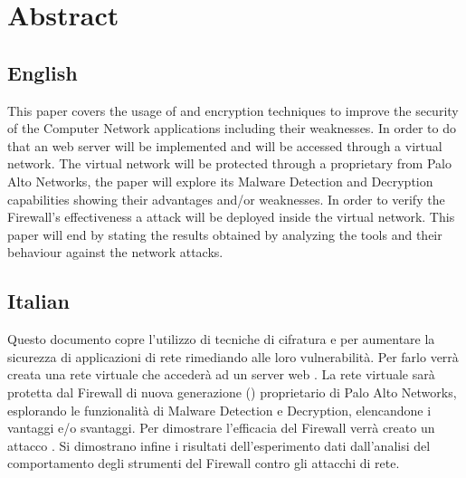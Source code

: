 \tableofcontents

\newpage

\chapter*{Abstract}


\section*{English}

This paper covers the usage of  and  encryption techniques to improve the security of the Computer Network applications including their weaknesses. In order to do that an  web server will be implemented and will be accessed through a virtual network.
The virtual network will be protected through a proprietary  from Palo Alto Networks, the paper will explore its Malware Detection and  Decryption capabilities showing their advantages and/or weaknesses.
In order to verify the Firewall's effectiveness a  attack will be deployed inside the virtual network.
This paper will end by stating the results obtained by analyzing the  tools and their behaviour against the network attacks.

\section*{Italian}

Questo documento copre l'utilizzo di tecniche di cifratura  e  per aumentare la sicurezza di applicazioni di rete rimediando alle loro vulnerabilit\`a.
Per farlo verr\`a creata una rete virtuale che acceder\`a ad un server web .
La rete virtuale sar\`a protetta dal Firewall di nuova generazione () proprietario di Palo Alto Networks, esplorando le funzionalit\`a di Malware Detection e  Decryption, elencandone i vantaggi e/o svantaggi.
Per dimostrare l'efficacia del Firewall verr\`a creato un attacco .
Si dimostrano infine i risultati dell'esperimento dati dall'analisi del comportamento degli strumenti del Firewall contro gli attacchi di rete.

\newpage

\printunsrtglossary[type=abbreviations,title=Acronyms]

